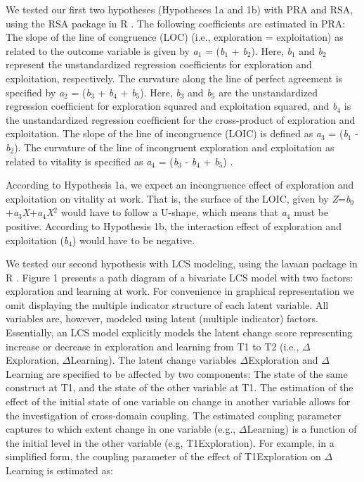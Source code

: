 \documentclass[man, 12pt, a4paper, noextraspace]{apa6}
\begin{document}
We tested our first two hypotheses (Hypotheses 1a and 1b) with PRA and RSA, using the RSA package in R \parencite{Schonbrodt2018}.
The following coefficients are estimated in PRA: The slope of the line of congruence (LOC) (i.e., exploration = exploitation) as related to the outcome variable is given by \textit{a}$_1$ = (\textit{b}$_1$ + \textit{b}$_2$). Here, \textit{b}$_1$ and \textit{b}$_2$ represent the unstandardized regression coefficients for exploration and exploitation, respectively.  
The curvature along the line of perfect agreement is specified by \textit{a}$_2$ = (\textit{b}$_3$ + \textit{b}$_4$ + \textit{b}$_5$). 
Here, \textit{b}$_3$ and \textit{b}$_5$ are the unstandardized regression coefﬁcient for exploration squared and exploitation squared, and \textit{b}$_4$ is the unstandardized regression coefﬁcient for the cross-product of exploration and exploitation. 
The slope of the line of incongruence (LOIC) is defined as \textit{a}$_3$ = (\textit{b}$_1$ - \textit{b}$_2$). 
The curvature of the line of incongruent exploration and exploitation as related to vitality is specified as \textit{a}$_4$ = (\textit{b}$_3$ - \textit{b}$_4$ + \textit{b}$_5$) \parencite{Shanock.2010b, Humberg2019}. \par 
According to Hypothesis 1a, we expect an incongruence effect of exploration and exploitation on vitality at work. 
That is, the surface of the LOIC, given by \textit{Z}=\textit{b}$_0$+\textit{a}$_3$\textit{X}+\textit{a}$_4$\textit{X}$^2$ would have to follow a U-shape, which means that \textit{a}$_4$ must be positive. 
According to Hypothesis 1b, the interaction effect of exploration and exploitation (\textit{b}$_4$) would have to be negative. \par 

We tested our second hypothesis with LCS modeling, using the lavaan package in R \parencite{Rosseel2012}. 
Figure 1 presents a path diagram of a bivariate LCS model with two factors: exploration and learning at work. 
For convenience in graphical representation we omit displaying the multiple indicator structure of each latent variable. 
All variables are, however, modeled using latent (multiple indicator) factors. 
Essentially, an LCS model explicitly models the latent change score representing increase or decrease in exploration and learning from T1 to T2 (i.e., $\Delta$Exploration, $\Delta$Learning). 
The latent change variables $\Delta$Exploration and $\Delta$Learning are specified to be affected by two components: The state of the same construct at T1, and the state of the other variable at T1. 
The estimation of the effect of the initial state of one variable on change in another variable allows for the investigation of cross-domain coupling. 
The estimated coupling parameter captures to which extent change in one variable (e.g., $\Delta$Learning) is a function of the initial level in the other variable (e.g, T1Exploration). 
For example, in a simplified form, the coupling parameter of the effect of T1Exploration on $\Delta$Learning is estimated as:
\end{document}
